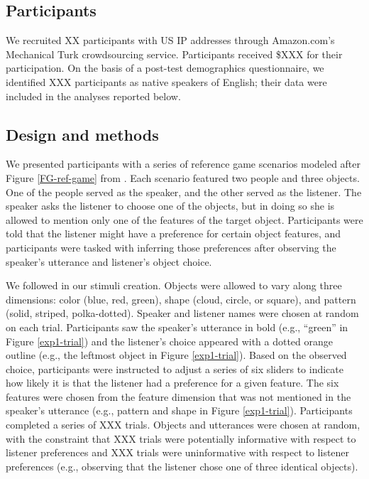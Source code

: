 \documentclass[10pt,a4paper]{article}
\begin{document}
\subsection{Participants}

We recruited XX participants with US IP addresses through Amazon.com's Mechanical Turk crowdsourcing service. Participants received \$XXX for their participation. On the basis of a post-test demographics questionnaire, we identified XXX participants as native speakers of English; their data were included in the analyses reported below.

\subsection{Design and methods}

We presented participants with a series of reference game scenarios modeled after Figure \ref{FG-ref-game} from . Each scenario featured two people and three objects. One of the people served as the speaker, and the other served as the listener. The speaker asks the listener to choose one of the objects, but in doing so she is allowed to mention only one of the features of the target object. Participants were told that the listener might have a preference for certain object features, and participants were tasked with inferring those preferences after observing the speaker's utterance and listener's object choice.

We followed  in our stimuli creation. Objects were allowed to vary along three dimensions: color (blue, red, green), shape (cloud, circle, or square), and pattern (solid, striped, polka-dotted). Speaker and listener names were chosen at random on each trial. Participants saw the speaker's utterance in bold (e.g., ``green'' in Figure \ref{exp1-trial}) and the listener's choice appeared with a dotted orange outline (e.g., the leftmost object in Figure \ref{exp1-trial}). Based on the observed choice, participants were instructed to adjust a series of six sliders to indicate how likely it is that the listener had a preference for a given feature. The six features were chosen from the feature dimension that was not mentioned in the speaker's utterance (e.g., pattern and shape in Figure \ref{exp1-trial}). Participants completed a series of XXX trials. Objects and utterances were chosen at random, with the constraint that XXX trials were potentially informative with respect to listener preferences and XXX trials were uninformative with respect to listener preferences (e.g., observing that the listener chose one of three identical objects). 
\end{document}
